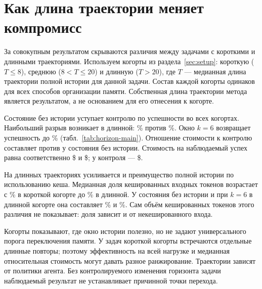 \section{Как длина траектории меняет компромисс}
\label{sec:horizon}

За совокупным результатом скрываются различия между задачами с короткими и
длинными траекториями. Используем когорты из раздела~\ref{sec:setup}:
короткую ($T\leq8$), среднюю ($8<T\leq20$) и длинную ($T>20$), где $T$ ---
медианная длина траектории полной истории для данной задачи. Состав каждой
когорты одинаков для всех способов организации памяти. Собственная длина
траектории метода является результатом, а не основанием для его отнесения
к когорте.

\begin{table}[htbp]
\centering\small
\caption{Когорты длины траектории, заданные контролем: качество
и стоимость. Учитываются все включённые исходы. Отношение стоимости ---
медиана отношений к полной истории в той же задаче и том же повторе.}
\label{tab:horizon-main}
\resizebox{\textwidth}{!}{}
\end{table}

Состояние без истории уступает контролю по успешности во всех когортах.
Наибольший разрыв возникает в длинной: \HorizonLongModelStateRate\% против
\HorizonLongModelControlRate\%. Окно $k=6$ возвращает успешность до
\HorizonLongModelHistorySixRate\% (табл.~\ref{tab:horizon-main}). Отношение
стоимости к контролю составляет \HorizonLongModelHistorySixAllCostRatio{}
против \HorizonLongModelStateAllCostRatio{} у состояния без истории.
Стоимость на наблюдаемый успех равна соответственно
\$\HorizonLongModelHistorySixCostPerSuccess{} и
\$\HorizonLongModelStateCostPerSuccess{}; у контроля ---
\$\HorizonLongModelControlCostPerSuccess{}.

\begin{table}[htbp]
\centering\small
\caption{Те же когорты: медианы контекста и токенов. Cache hit ---
медиана доли $K/(U+K)$ по выполнениям; столбцы токенов --- отдельные
медианы.}
\label{tab:horizon-cache}
\resizebox{\textwidth}{!}{}
\end{table}

На длинных траекториях усиливается и преимущество полной истории по
использованию кеша. Медианная доля кешированных входных токенов возрастает
с \HorizonShortModelControlCacheHit\% в короткой когорте до
\HorizonLongModelControlCacheHit\% в длинной. У состояния без истории и
при $k=6$ в длинной когорте она составляет
\HorizonLongModelStateCacheHit\% и \HorizonLongModelHistorySixCacheHit\%.
Сам объём кешированных токенов этого различия не показывает: доля зависит
и от некешированного входа.

Когорты показывают, где окно истории полезно, но не задают универсального
порога переключения памяти. У задач короткой когорты встречаются отдельные
длинные повторы; поэтому эффективность на всей нагрузке и медианная
относительная стоимость могут давать разное ранжирование. Траектории
зависят от политики агента. Без контролируемого изменения горизонта задачи
наблюдаемый результат не устанавливает причинной точки перехода.
